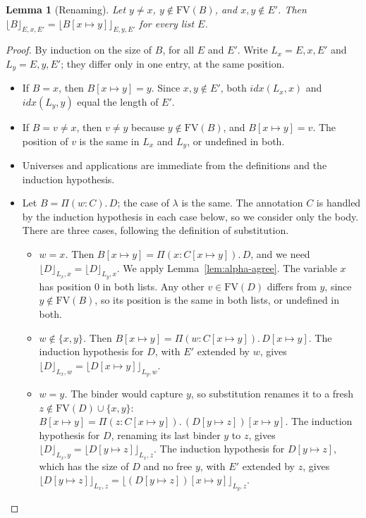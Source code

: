 \documentclass[acmsmall,screen,nonacm]{acmart}
\newtheorem{lemma}[theorem]{Lemma}
\newcommand{\tPi}[3]{\Pi(#1{:}#2).\,#3}
\newcommand{\subst}[3]{#1[#2 \mapsto #3]}
\newcommand{\FV}{\mathrm{FV}}
\newcommand{\db}[2]{\lfloor #1 \rfloor_{#2}}
\begin{document}
\begin{lemma}[Renaming]
\label{lem:alpha-rename}
Let $y \neq x$, $y \notin \FV(B)$, and $x, y \notin E'$.
Then $\db{B}{E, x, E'} = \db{\subst{B}{x}{y}}{E, y, E'}$ for every list $E$.
\end{lemma}

\begin{proof}
By induction on the size of $B$, for all $E$ and $E'$.
Write $L_x = E, x, E'$ and $L_y = E, y, E'$; they differ only in one entry, at the same position.
\begin{itemize}
  \item If $B = x$, then $\subst{B}{x}{y} = y$. Since $x, y \notin E'$, both $\mathit{idx}(L_x, x)$ and $\mathit{idx}(L_y, y)$ equal the length of $E'$.
  \item If $B = v \neq x$, then $v \neq y$ because $y \notin \FV(B)$, and $\subst{B}{x}{y} = v$.
    The position of $v$ is the same in $L_x$ and $L_y$, or undefined in both.
  \item Universes and applications are immediate from the definitions and the induction hypothesis.
  \item Let $B = \tPi{w}{C}{D}$; the case of $\lambda$ is the same.
    The annotation $C$ is handled by the induction hypothesis in each case below, so we consider only the body.
    There are three cases, following the definition of substitution.
    \begin{itemize}
      \item \emph{$w = x$.} Then $\subst{B}{x}{y} = \tPi{x}{\subst{C}{x}{y}}{D}$, and we need $\db{D}{L_x, x} = \db{D}{L_y, x}$.
        We apply Lemma~\ref{lem:alpha-agree}.
        The variable $x$ has position $0$ in both lists.
        Any other $v \in \FV(D)$ differs from $y$, since $y \notin \FV(B)$, so its position is the same in both lists, or undefined in both.
      \item \emph{$w \notin \{x, y\}$.} Then $\subst{B}{x}{y} = \tPi{w}{\subst{C}{x}{y}}{\subst{D}{x}{y}}$.
        The induction hypothesis for $D$, with $E'$ extended by $w$, gives $\db{D}{L_x, w} = \db{\subst{D}{x}{y}}{L_y, w}$.
      \item \emph{$w = y$.} The binder would capture $y$, so substitution renames it to a fresh $z \notin \FV(D) \cup \{x, y\}$:
        $\subst{B}{x}{y} = \tPi{z}{\subst{C}{x}{y}}{\subst{(\subst{D}{y}{z})}{x}{y}}$.
        The induction hypothesis for $D$, renaming its last binder $y$ to $z$, gives $\db{D}{L_x, y} = \db{\subst{D}{y}{z}}{L_x, z}$.
        The induction hypothesis for $\subst{D}{y}{z}$, which has the size of $D$ and no free $y$, with $E'$ extended by $z$,
        gives $\db{\subst{D}{y}{z}}{L_x, z} = \db{\subst{(\subst{D}{y}{z})}{x}{y}}{L_y, z}$. \qedhere
    \end{itemize}
\end{itemize}
\end{proof}
\end{document}

